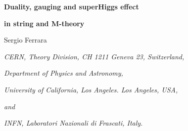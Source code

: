 \documentclass[a4paper,12pt]{article}
\begin{document}


\providecommand{\R}{\mathbb{R}}
\providecommand{\C}{\mathbb{C}}
\providecommand{\Z}{\mathbb{Z}}
\providecommand{\Hb}{\mathbb{H}}

\providecommand{\rE}{\mathrm{E}}
\providecommand{\rSp}{\mathrm{Sp}}
\providecommand{\rSO}{\mathrm{SO}}
\providecommand{\rSL}{\mathrm{SL}}
\providecommand{\rSU}{\mathrm{SU}}
\providecommand{\rUSp}{\mathrm{USp}}
\providecommand{\rU}{\mathrm{U}}
\providecommand{\rF}{\mathrm{F}}
\providecommand{\rGL}{\mathrm{GL}}
\providecommand{\rG}{\mathrm{G}}
\providecommand{\rK}{\mathrm{K}}


\providecommand{\fgl}{\mathfrak{gl}}
\providecommand{\fu}{\mathfrak{u}}
\providecommand{\fsl}{\mathfrak{sl}}
\providecommand{\fsp}{\mathfrak{sp}}
\providecommand{\fusp}{\mathfrak{usp}}
\providecommand{\fsu}{\mathfrak{su}}
\providecommand{\fp}{\mathfrak{p}}
\providecommand{\fso}{\mathfrak{so}}
\providecommand{\fl}{\mathfrak{l}}
\providecommand{\fg}{\mathfrak{g}}
\providecommand{\fr}{\mathfrak{r}}
\providecommand{\fe}{\mathfrak{e}}
\providecommand{\ft}{\mathfrak{t}}





\providecommand{\id}{\relax{\rm 1\kern-.35em 1}}
\vskip 1.5cm


  \centerline{\LARGE \bf Duality, gauging and superHiggs effect}
  
  \bigskip
  
  \centerline{\LARGE\bf in string and M-theory }





 \vskip 3cm
 \centerline{\large Sergio Ferrara}

\vskip 1.5cm



\centerline{\it CERN, Theory Division, CH 1211 Geneva 23,
Switzerland, }

\medskip

\centerline{\it Department of Physics and Astronomy,} \centerline{\it University of California,
Los Angeles. Los Angeles, USA, } 

\smallskip
\centerline{\it and} 

\smallskip

\centerline{\it  INFN, Laboratori Nazionali di
Frascati, Italy.}





\vskip 1cm
\end{document}
